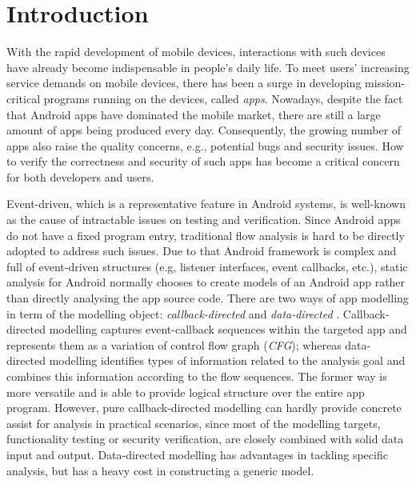 \section{Introduction}
With the rapid development of mobile devices, interactions with such devices have already become indispensable in people's daily life. To meet users' increasing service demands on mobile devices, there has been a surge in developing mission-critical programs running on the devices, called \textit{apps}. Nowadays, despite the fact that Android apps have dominated the mobile market, there are still a large amount of apps being produced every day. Consequently, the growing number of apps also raise the quality concerns, e.g., potential bugs and security issues. How to verify the correctness and security of such apps has become a critical concern for both developers and users.

Event-driven, which is a representative feature in Android systems, is well-known as the cause of intractable issues on testing and verification. Since Android apps do not have a fixed program entry, traditional flow analysis \cite{new1976program, new1978dataflow} is hard to be directly adopted to address such issues. Due to that Android framework is complex and full of event-driven structures (e.g, listener interfaces, event callbacks, etc.), static analysis for Android normally chooses to create models of an Android app rather than directly analysing the app source code. There are two ways of app modelling in term of the modelling object: \textit{callback-directed} \cite{new2013contextual,new2015static} and \textit{data-directed} \cite{new2014flowdroid, new2015DroidSafe}. Callback-directed modelling captures event-callback sequences within the targeted app and represents them as a variation of control flow graph (\textit{CFG}); whereas data-directed modelling identifies types of information related to the analysis goal and combines this information according to the flow sequences. The former way is more versatile and is able to provide logical structure over the entire app program. However, pure callback-directed modelling can hardly provide concrete assist for analysis in practical scenarios, since most of the modelling targets, functionality testing or security verification, are closely combined with solid data input and output.
Data-directed modelling has advantages in tackling specific analysis, but has a heavy cost in constructing a generic model. 

